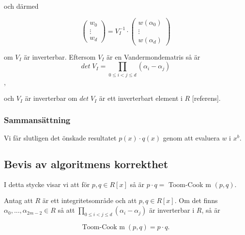 och därmed

\begin{equation}
\label{eq:NAME5}
\begin{pmatrix}
  w_0\\
  \vdots\\
  w_d
\end{pmatrix} =
V_I^{-1} \cdot
\begin{pmatrix}
  w(\alpha_0)\\
  \vdots\\
  w(\alpha_d)
\end{pmatrix}
\end{equation}

om $V_I$ är inverterbar. Eftersom $V_I$ är en Vandermondematris så är
\begin{equation}
 \label{eq:NAME6}
det \; V_I = \prod_{0 \leq i < j \leq d} (\alpha_i - \alpha_j)
\end{equation},

och $V_I$ är inverterbar om $det \; V_I$ är ett inverterbart element i $R$ [referens].

\subsubsection{Sammansättning}
Vi får slutligen det önskade resultatet $p(x) \cdot q(x)$ genom att evaluera $w$ i $x^b$.

\subsection{Bevis av algoritmens korrekthet}
I detta stycke visar vi att för $p, q \in R[x]$ så är $p \cdot q =$ Toom-Cook m $(p, q)$.

\begin{proposition}
 Antag att $R$ är ett integritetsområde och att $p, q \in R[x]$. Om det finns
$\alpha_0, ...,  \alpha_{2m-2} \in R$ så att $ \prod_{0 \leq i < j \leq d} (\alpha_i - \alpha_j)$
är inverterbar i $R$, så är

\begin{equation}
  \label{eq:name7}
  \text{Toom-Cook m} \; (p, q) =  p \cdot q.
\end{equation}

\end{proposition}

